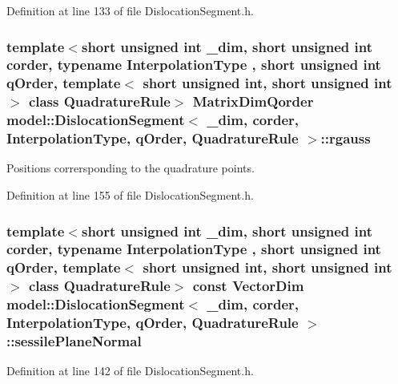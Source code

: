 Definition at line 133 of file Dislocation\+Segment.\+h.

\hypertarget{classmodel_1_1_dislocation_segment_ab3d7bac9e0d2027bd09fdb4ffbd7245d}{}
\subsubsection[{rgauss}]{\setlength{\rightskip}{0pt plus 5cm}template$<$short unsigned int \+\_\+dim, short unsigned int corder, typename Interpolation\+Type , short unsigned int q\+Order, template$<$ short unsigned int, short unsigned int $>$ class Quadrature\+Rule$>$ {\bf Matrix\+Dim\+Qorder} {\bf model\+::\+Dislocation\+Segment}$<$ \+\_\+dim, corder, Interpolation\+Type, q\+Order, Quadrature\+Rule $>$\+::rgauss}\label{classmodel_1_1_dislocation_segment_ab3d7bac9e0d2027bd09fdb4ffbd7245d}


Positions corrersponding to the quadrature points. 



Definition at line 155 of file Dislocation\+Segment.\+h.

\hypertarget{classmodel_1_1_dislocation_segment_abfce403c2a5e50bb69ca704168595dfd}{}
\subsubsection[{sessile\+Plane\+Normal}]{\setlength{\rightskip}{0pt plus 5cm}template$<$short unsigned int \+\_\+dim, short unsigned int corder, typename Interpolation\+Type , short unsigned int q\+Order, template$<$ short unsigned int, short unsigned int $>$ class Quadrature\+Rule$>$ const {\bf Vector\+Dim} {\bf model\+::\+Dislocation\+Segment}$<$ \+\_\+dim, corder, Interpolation\+Type, q\+Order, Quadrature\+Rule $>$\+::sessile\+Plane\+Normal}\label{classmodel_1_1_dislocation_segment_abfce403c2a5e50bb69ca704168595dfd}


Definition at line 142 of file Dislocation\+Segment.\+h.

\hypertarget{classmodel_1_1_dislocation_segment_af62dc8d8b77556c77499e16f677af359}{}
